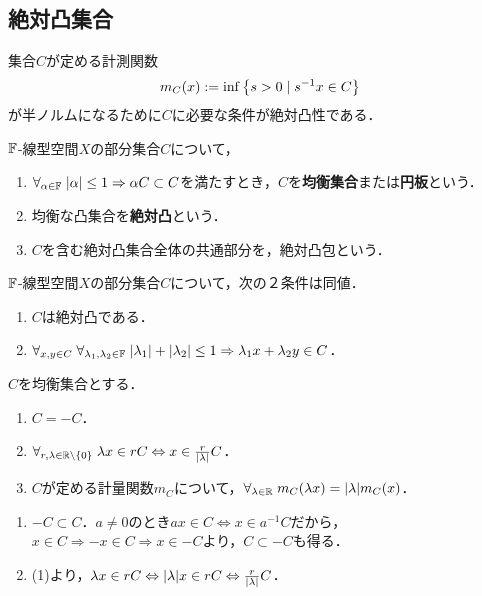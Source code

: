 \documentclass[uplatex,dvipdfmx]{jsreport}
\begin{document}
\subsection{絶対凸集合}

\begin{tcolorbox}[colframe=ForestGreen, colback=ForestGreen!10!white,breakable,colbacktitle=ForestGreen!40!white,coltitle=black,fonttitle=\bfseries\sffamily,
title=]
    集合$C$が定める計測関数
    \[m_C(x):=\inf\left\{s>0\mid s^{-1}x\in C\right\}\]
    が半ノルムになるために$C$に必要な条件が絶対凸性である．
\end{tcolorbox}

\begin{definition}
    $\mathbb{F}$-線型空間$X$の部分集合$C$について，
    \begin{enumerate}
        \item $\forall_{\alpha\in\mathbb{F}}\;\lvert\alpha\rvert\le 1\Rightarrow\alpha C\subset C$を満たすとき，$C$を\textbf{均衡集合}または\textbf{円板}という．
        \item 均衡な凸集合を\textbf{絶対凸}という．
        \item $C$を含む絶対凸集合全体の共通部分を，絶対凸包という．
    \end{enumerate}
\end{definition}

\begin{lemma}[絶対凸性の特徴付け]
    $\mathbb{F}$-線型空間$X$の部分集合$C$について，次の２条件は同値．
    \begin{enumerate}
        \item $C$は絶対凸である．
        \item $\forall_{x,y\in C}\;\forall_{\lambda_1,\lambda_2\in\mathbb{F}}\;\lvert\lambda_1\rvert+\lvert\lambda_2\rvert\le 1\Rightarrow \lambda_1x+\lambda_2y\in C$．
    \end{enumerate}
\end{lemma}

\begin{lemma}[均衡性]
    $C$を均衡集合とする．
    \begin{enumerate}
        \item $C=-C$．
        \item $\forall_{r,\lambda\in\mathbb{R}\setminus\{0\}}\;\lambda x\in rC\Leftrightarrow x\in\frac{r}{\lvert\lambda\rvert}C$．
        \item $C$が定める計量関数$m_C$について，$\forall_{\lambda\in\mathbb{R}}\;m_C(\lambda x)=\lvert\lambda\rvert m_C(x)$．
    \end{enumerate}
\end{lemma}
\begin{Proof}\mbox{}
    \begin{enumerate}
        \item $-C\subset C$．$a\ne0$のとき$ax\in C\Leftrightarrow x\in a^{-1}C$だから，$x\in C\Rightarrow -x\in C\Rightarrow x\in -C$より，$C\subset-C$も得る．
        \item (1)より，$\lambda x\in rC\Leftrightarrow\lvert\lambda\rvert x\in rC\Leftrightarrow\frac{r}{\lvert\lambda\rvert}C$．
    \end{enumerate}
\end{Proof}
\end{document}

